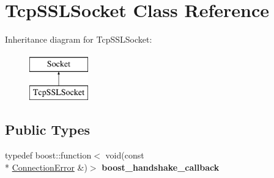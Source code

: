 \hypertarget{class_tcp_s_s_l_socket}{\section{Tcp\-S\-S\-L\-Socket Class Reference}
\label{class_tcp_s_s_l_socket}
}
Inheritance diagram for Tcp\-S\-S\-L\-Socket\-:\begin{figure}[H]
\begin{center}
\leavevmode
\includegraphics[height=2.000000cm]{class_tcp_s_s_l_socket}
\end{center}
\end{figure}
\subsection*{Public Types}
\begin{DoxyCompactItemize}
\item 
\hypertarget{class_tcp_s_s_l_socket_adc3acccf5cfbe7c7821b6161b36d756b}{typedef boost\-::function$<$ void(const \\*
\hyperlink{_connection_error_8h_a3eb2ebd912cc5460d23e45f7188a0a86}{Connection\-Error} \&)$>$ {\bfseries boost\-\_\-handshake\-\_\-callback}}\label{class_tcp_s_s_l_socket_adc3acccf5cfbe7c7821b6161b36d756b}

\end{DoxyCompactItemize}
